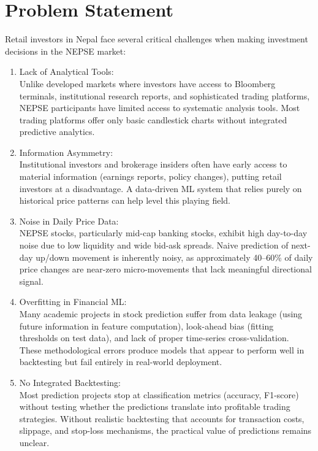 \documentclass[12pt, a4paper]{report}
\begin{document}
	\section{Problem Statement}
	Retail investors in Nepal face several critical challenges when making investment decisions in the NEPSE market:
	
	\vspace{-18pt}
	\begin{enumerate}
		\renewcommand{\labelenumi}{\roman{enumi}.}
		\item Lack of Analytical Tools:\\
		Unlike developed markets where investors have access to Bloomberg terminals, institutional research reports, and sophisticated trading platforms, NEPSE participants have limited access to systematic analysis tools. Most trading platforms offer only basic candlestick charts without integrated predictive analytics.
		\item Information Asymmetry:\\
		Institutional investors and brokerage insiders often have early access to material information (earnings reports, policy changes), putting retail investors at a disadvantage. A data-driven ML system that relies purely on historical price patterns can help level this playing field.
		\item Noise in Daily Price Data:\\
		NEPSE stocks, particularly mid-cap banking stocks, exhibit high day-to-day noise due to low liquidity and wide bid-ask spreads. Naive prediction of next-day up/down movement is inherently noisy, as approximately 40--60\% of daily price changes are near-zero micro-movements that lack meaningful directional signal.
		\item Overfitting in Financial ML:\\
		Many academic projects in stock prediction suffer from data leakage (using future information in feature computation), look-ahead bias (fitting thresholds on test data), and lack of proper time-series cross-validation. These methodological errors produce models that appear to perform well in backtesting but fail entirely in real-world deployment.
		\item No Integrated Backtesting:\\
		Most prediction projects stop at classification metrics (accuracy, F1-score) without testing whether the predictions translate into profitable trading strategies. Without realistic backtesting that accounts for transaction costs, slippage, and stop-loss mechanisms, the practical value of predictions remains unclear.
	\end{enumerate}
	
\end{document}

